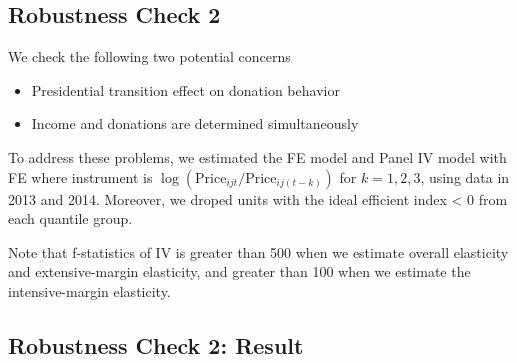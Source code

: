 \documentclass[ review  , 3p ]{elsarticle}
\providecommand{\tightlist}{%
  \setlength{\itemsep}{0pt}\setlength{\parskip}{0pt}}
\begin{document}
  \hypertarget{robustness-check-2}{%
  \subsection{Robustness Check 2}\label{robustness-check-2}}
  
  We check the following two potential concerns
  
  \begin{itemize}
  \tightlist
  \item
    Presidential transition effect on donation behavior
  \item
    Income and donations are determined simultaneously
  \end{itemize}
  
  To address these problems, we estimated the FE model and Panel IV model with FE where instrument is \(\log(\text{Price}_{ijt}/\text{Price}_{ij(t-k)})\) for \(k = 1, 2, 3\), using data in 2013 and 2014.
  Moreover, we droped units with the ideal efficient index \textless{} 0 from each quantile group.
  
  Note that f-statistics of IV is greater than 500 when we estimate overall elasticity and extensive-margin elasticity, and greater than 100 when we estimate the intensive-margin elasticity.
  
  \hypertarget{robustness-check-2-result}{%
  \subsection{Robustness Check 2: Result}\label{robustness-check-2-result}}
  
\end{document}
